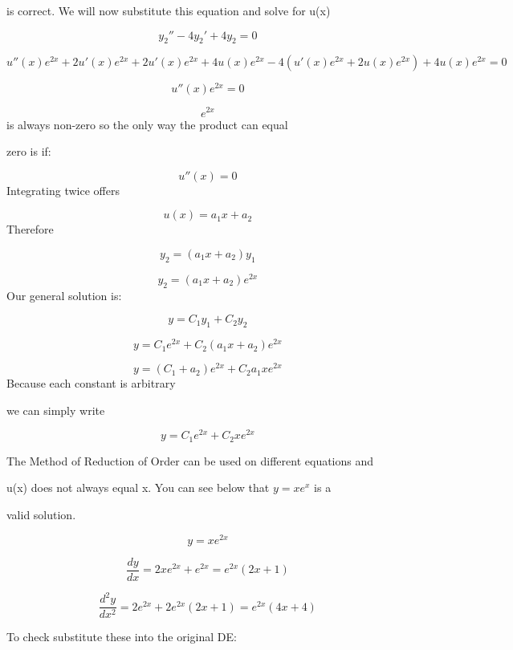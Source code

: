 is correct. We will now substitute this equation and solve for u(x)



$$y_2''-4y_2'+4y_2=0\,$$



$$u''(x)e^{2x}+2u'(x)e^{2x}+2u'(x)e^{2x}+4u(x)e^{2x}-4(u'(x)e^{2x}+2u(x)e^{2x})+4u(x)e^{2x}=0\,$$



$$u''(x)e^{2x}=0\,$$



$$e^{2x}\,$$ is always non-zero so the only way the product can equal

zero is if:



$$u''(x)=0\,$$ Integrating twice offers



$$u(x)=a_1x + a_2\,$$ Therefore



$$y_2=(a_1x+a_2)y_1\,$$



$$y_2=(a_1x+a_2)e^{2x}\,$$ Our general solution is:



$$y=C_1y_1+C_2y_2\,$$



$$y=C_1e^{2x}+C_2(a_1x+a_2)e^{2x}\,$$



$$y=(C_1+a_2)e^{2x}+C_2a_1xe^{2x}\,$$ Because each constant is arbitrary

we can simply write



$$y=C_1e^{2x}+C_2xe^{2x}\,$$



The Method of Reduction of Order can be used on different equations and

u(x) does not always equal x. You can see below that $y=xe^{x}$ is a

valid solution.



$$y=xe^{2x}\,$$



$$\frac{dy}{dx}=2xe^{2x}+e^{2x}=e^{2x}(2x+1)\,$$



$$\frac{d^2y}{dx^2}=2e^{2x}+2e^{2x}(2x+1)=e^{2x}(4x+4)\,$$



To check substitute these into the original DE:



